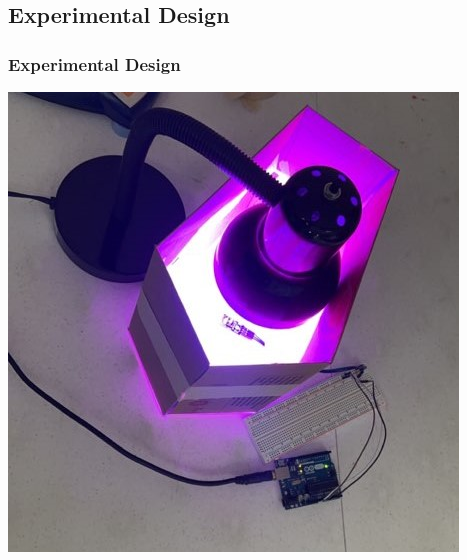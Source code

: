 \documentclass[10pt,aspectratio=169]{beamer} %
\begin{document}
\subsection{Experimental Design}
\begin{frame}\centering
  \frametitle{Experimental Design}
  \includegraphics[scale = 0.5]{UVLamp.jpg}
\end{frame}
\end{document}

